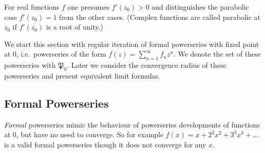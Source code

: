 \documentclass{article}
\numberwithin{equation}{section}
\begin{document}
\begin{figure}
  \label{figsqrt2}
\end{figure}


For real functions $f$ one presumes $f'(z_0)>0$ and distinguishes the
parabolic case $f'(z_0)=1$ from the other cases. (Complex functions
are called parabolic at $z_0$ if $f'(z_0)$ is a root of unity.)

\newcommand{\pso}{\mathfrak{P}_0}
We start this section with regular iteration of formal
powerseries with fixed point at 0, i.e.\ powerseries of the form
$f(z)=\sum_{n=1}^\infty f_n z^n$. We denote the set of these
powerseries with $\pso$. Later we consider the convergence
radius of these powerseries and present equivalent limit formulas.

\subsection{Formal Powerseries}
{\em Formal} powerseries mimic the behaviour of powerseries
developments of functions at 0, but have no need to converge. 
So for example $f(x)=x+2^2x^2+3^3x^3+\dots$ is a valid formal
powerseries though it does not converge for any $x$.
\end{document}
